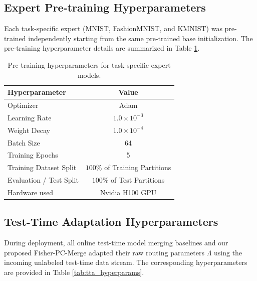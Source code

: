 \documentclass{article}
\theoremstyle{plain}
\theoremstyle{definition}
\theoremstyle{remark}
\begin{document}
\subsection{Expert Pre-training Hyperparameters}
Each task-specific expert (MNIST, FashionMNIST, and KMNIST) was pre-trained independently starting from the same pre-trained base initialization. The pre-training hyperparameter details are summarized in Table \ref{tab:pretraining_hyperparams}.

\begin{table}[H]
\caption{Pre-training hyperparameters for task-specific expert models.}
\label{tab:pretraining_hyperparams}
\vskip 0.15in
\begin{center}
\begin{small}
\begin{sc}
\begin{tabular}{lc}
\toprule
Hyperparameter & Value \\
\midrule
Optimizer & Adam \\
Learning Rate & \(1.0 \times 10^{-3}\) \\
Weight Decay & \(1.0 \times 10^{-4}\) \\
Batch Size & 64 \\
Training Epochs & 5 \\
Training Dataset Split & \(100\%\) of Training Partitions \\
Evaluation / Test Split & \(100\%\) of Test Partitions \\
Hardware used & Nvidia H100 GPU \\
\bottomrule
\end{tabular}
\end{sc}
\end{small}
\end{center}
\vskip -0.1in
\end{table}

\subsection{Test-Time Adaptation Hyperparameters}
During deployment, all online test-time model merging baselines and our proposed Fisher-PC-Merge adapted their raw routing parameters $\Lambda$ using the incoming unlabeled test-time data stream. The corresponding hyperparameters are provided in Table \ref{tab:tta_hyperparams}.
\end{document}
